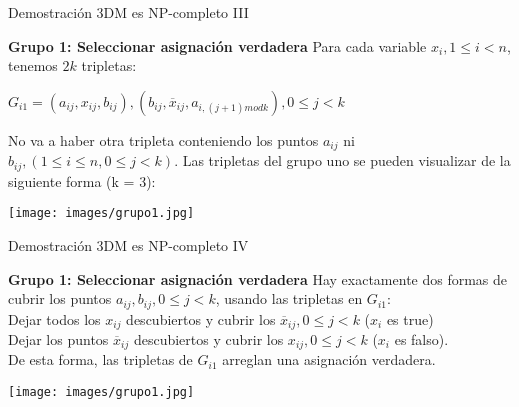 \documentclass[10pt, mathserif, profesionalfont]{beamer}
\begin{document}
	\begin{frame}{Demostración 3DM es NP-completo III}
		
		\begin{block}{\textbf{Grupo 1: Seleccionar asignación verdadera}}
			Para cada variable $x_i, 1 \leq i < n$, tenemos $2k$ tripletas:
			
			$G_{i1} = {(a_{ij}, x_{ij}, b_{ij}), (b_{ij} , \overline x_{ij}, a_{i,(j+1)mod k}), 0 \leq j < k}$
			
			
		\end{block}
		No va a haber otra tripleta conteniendo los puntos $a_{ij}$ ni $b_{ij}, (1 \leq i \leq n, 0 \leq j < k)$. Las tripletas del grupo uno se pueden visualizar de la siguiente forma (k = 3):
		\begin{center}
			\texttt{[image: images/grupo1.jpg]}
		\end{center}
	\end{frame}
	
	\begin{frame}{Demostración 3DM es NP-completo IV}
		
		\begin{block}{\textbf{Grupo 1: Seleccionar asignación verdadera}}
			Hay exactamente dos formas de cubrir los puntos $a_{ij}, b_{ij}, 0 \leq j < k$, usando las tripletas en $G_{i1}$:
			\\Dejar todos los $x_{ij}$ descubiertos y cubrir los $\overline x_{ij}, 0 \leq j < k$ ($x_i$ es true)
			\\Dejar los puntos $\overline x_{ij}$ descubiertos y cubrir los $x_{ij}, 0 \leq j < k$ ($x_i$ es falso). 
			\\De esta forma, las tripletas de $G_{i1}$ arreglan una asignación verdadera.
			
		\end{block}
		
		\begin{center}
			\texttt{[image: images/grupo1.jpg]}
		\end{center}	
		
	\end{frame}
	
\end{document}
